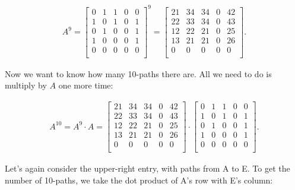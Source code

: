 \begin{alttitles}
\vspace{-.15in}
\begin{align*}
A^9 = 
\begin{bmatrix}
0 & 1 & 1 & 0 & 0 \\
1 & 0 & 1 & 0 & 1 \\
0 & 1 & 0 & 0 & 1 \\
1 & 0 & 0 & 0 & 1 \\
0 & 0 & 0 & 0 & 0 \\
\end{bmatrix}^9 =
\begin{bmatrix}
 21 & 34 & 34 &  0 & 42 \\
 22 & 33 & 34 &  0 & 43 \\
 12 & 22 & 21 &  0 & 25 \\
 13 & 21 & 21 &  0 & 26 \\
 0 &  0 &  0 &  0 &  0 \\
\end{bmatrix}.
\end{align*}
\vspace{-.15in}

Now we want to know how many 10-paths there are. All we need to do is multiply
by $A$ one more time:

\vspace{-.15in}
\begin{align*}
A^{10} = 
A^9 \cdot A = 
\begin{bmatrix}
 21 & 34 & 34 &  0 & 42 \\
 22 & 33 & 34 &  0 & 43 \\
 12 & 22 & 21 &  0 & 25 \\
 13 & 21 & 21 &  0 & 26 \\
 0 &  0 &  0 &  0 &  0 \\
\end{bmatrix} \cdot
\begin{bmatrix}
0 & 1 & 1 & 0 & 0 \\
1 & 0 & 1 & 0 & 1 \\
0 & 1 & 0 & 0 & 1 \\
1 & 0 & 0 & 0 & 1 \\
0 & 0 & 0 & 0 & 0 \\
\end{bmatrix}.
\end{align*}
\vspace{-.15in}

Let's again consider the upper-right entry, with paths from A to E. To get the
number of 10-paths, we take the dot product of A's row with E's column:


\end{alttitles}

